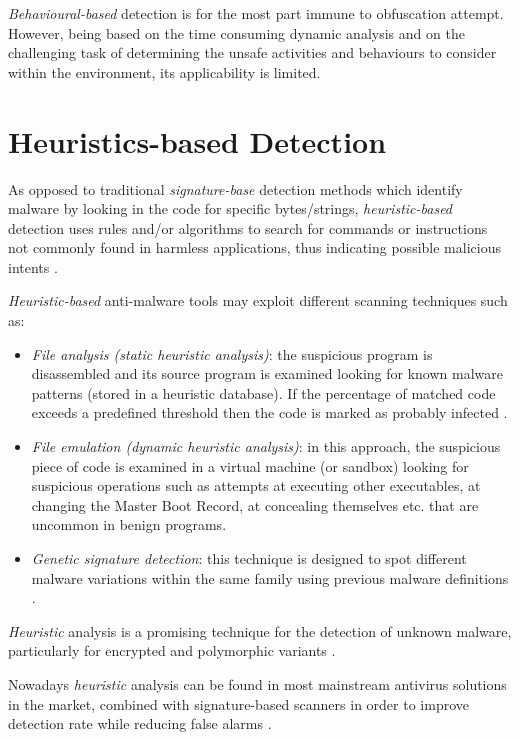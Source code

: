 \documentclass[pdfa%
,cucitura%
]{toptesi}
\begin{document}
\textit{Behavioural-based} detection is for the most part immune to obfuscation attempt. However, being based on the time consuming dynamic analysis and on the challenging task of determining the unsafe activities and behaviours to consider within the environment, its applicability is limited.

\section{Heuristics-based Detection}
As opposed to traditional \textit{signature-base} detection methods which identify malware by looking in the code for specific bytes/strings, \textit{heuristic-based} detection uses rules and/or algorithms to search for commands or instructions not commonly found in harmless applications, thus indicating possible malicious intents \cite{MiaoUHSS}.

\textit{Heuristic-based} anti-malware tools may exploit different scanning techniques such as:
\begin{itemize}
	\item \textit{File analysis (static heuristic analysis)}: the suspicious program is disassembled and its source program is examined looking for known malware patterns (stored in a heuristic database). If the percentage of matched code exceeds a predefined threshold then the code is marked as probably infected \cite{KasperskyWHA}.
	
	\item \textit{File emulation (dynamic heuristic analysis)}: in this approach, the suspicious piece of code is examined in a virtual machine (or sandbox) looking for suspicious operations such as attempts at executing other executables, at changing the Master Boot Record, at concealing themselves etc. that are uncommon in benign programs.
	
	\item \textit{Genetic signature detection}: this technique is designed to spot different malware variations within the same family using previous malware definitions \cite{ForcepointWHA}.
\end{itemize}

\textit{Heuristic} analysis is a promising technique for the detection of unknown malware, particularly for encrypted and polymorphic variants \cite{Sharma_2014}.

Nowadays \textit{heuristic} analysis can be found in most mainstream antivirus solutions in the market, combined with signature-based scanners in order to improve detection rate while reducing false alarms \cite{NamanyaTWM}.
\end{document}
